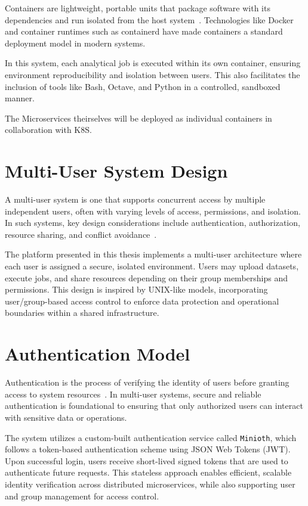 Containers are lightweight, portable units that package software with its dependencies and run isolated from the host 
system~\cite{docker-docs}. Technologies like Docker and container runtimes such as containerd have made containers a 
standard deployment model in modern systems.

In this system, each analytical job is executed within its own container, ensuring environment reproducibility and isolation 
between users. This also facilitates the inclusion of tools like Bash, Octave, and Python in a controlled, sandboxed manner.

The Microservices theirselves will be deployed as individual containers in collaboration with K8S.
\section{Multi-User System Design}

A multi-user system is one that supports concurrent access by multiple independent users, often with varying levels of access, 
permissions, and isolation. In such systems, key design considerations include authentication, authorization, resource sharing, 
and conflict avoidance~\cite{tanenbaum-os}.

The platform presented in this thesis implements a multi-user architecture where each user is assigned a secure, isolated environment. 
Users may upload datasets, execute jobs, and share resources depending on their group memberships and permissions. This design is 
inspired by UNIX-like models, incorporating user/group-based access control to enforce data protection and operational boundaries 
within a shared infrastructure.

\newpage
\section{Authentication Model}

Authentication is the process of verifying the identity of users before granting access to system resources~\cite{ferraiolo-auth}. 
In multi-user systems, secure and reliable authentication is foundational to ensuring that only authorized users can interact with 
sensitive data or operations.

The system utilizes a custom-built authentication service called \texttt{Minioth}, which follows a token-based authentication scheme 
using JSON Web Tokens (JWT). Upon successful login, users receive short-lived signed tokens that are used to authenticate future requests. 
This stateless approach enables efficient, scalable identity verification across distributed microservices, while also supporting user and 
group management for access control.

